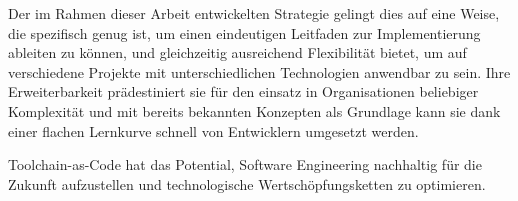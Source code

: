 Der im Rahmen dieser Arbeit entwickelten  Strategie gelingt dies auf eine Weise, die spezifisch genug ist, um einen eindeutigen Leitfaden zur Implementierung ableiten zu können, und gleichzeitig ausreichend Flexibilität bietet, um auf verschiedene Projekte mit unterschiedlichen Technologien anwendbar zu sein. Ihre Erweiterbarkeit prädestiniert sie für den einsatz in Organisationen beliebiger Komplexität und mit bereits bekannten Konzepten als Grundlage kann sie dank einer flachen Lernkurve schnell von Entwicklern umgesetzt werden.

Toolchain-as-Code hat das Potential, Software Engineering nachhaltig für die Zukunft aufzustellen und technologische Wertschöpfungsketten zu optimieren.
